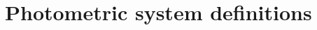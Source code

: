 \documentclass[a4paper, 11pt]{report}
\begin{document}
  
  \clearpage
  
  \section{Photometric system definitions}
  \label{ap:cal_HA}
  
  
  

  
  
  \label{ap:cal_JFL}
  \clearpage
  
  
  
  

  

  

\clearpage

%



\end{document}
